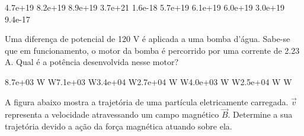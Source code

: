 \documentclass[12pt, addpoints]{exam}
\begin{document}
\begin{questions}
\begin{multicols*}{2}
\begin{oneparchoices}
\choice 4.7e+19 \choice 8.2e+19 \choice 8.9e+19 \choice 3.7e+21 \choice 1.6e-18 \choice 5.7e+19 \choice 6.1e+19 \choice 6.0e+19 \choice 3.0e+19 \choice 9.4e-17 
\end{oneparchoices}\question Uma diferença de potencial de 120 V é aplicada a uma bomba d’água. Sabe-se que em funcionamento, o motor da bomba é percorrido por uma corrente de    2.23 A. Qual é a potência desenvolvida nesse motor?

\begin{oneparchoices}
\choice 8.7e+03 W W\choice 7.1e+03 W\choice 3.4e+04 W\choice 2.7e+04 W W\choice 4.0e+03 W W\choice 2.5e+04 W W
\end{oneparchoices}\question A ﬁgura abaixo mostra a trajetória de uma partícula eletricamente carregada. $\vec{{v}}$ representa a velocidade atravessando um campo magnético $\vec{{B}}$. Determine a sua trajetória devido a ação da força magnética atuando sobre ela.
        
        \begin{center}
            \begin{minipage}[c]{0.5\linewidth}
            \end{minipage}
        \end{center}

        


\end{multicols*}
\end{questions}
\end{document}
